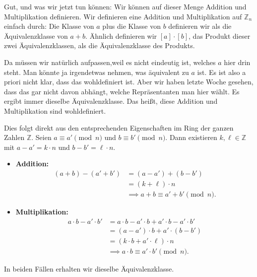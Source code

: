 \begin{spoken-clean}[00:08:20 - 00:10:21]
Gut, und was wir jetzt tun können: Wir können auf dieser Menge Addition und Multiplikation definieren. Wir definieren eine Addition und Multiplikation auf $\mathbb{Z}_n$ einfach durch: Die Klasse von $a$ plus die Klasse von $b$ definieren wir als die Äquivalenzklasse von $a + b$. Ähnlich definieren wir $[a] \cdot [b]$, das Produkt dieser zwei Äquivalenzklassen, als die Äquivalenzklasse des Produkts.

Da müssen wir natürlich aufpassen,weil es nicht eindeutig ist, welches $a$ hier drin steht. Man könnte ja irgendetwas nehmen, was äquivalent zu $a$ ist. Es ist also a priori nicht klar, dass das wohldefiniert ist. Aber wir haben letzte Woche gesehen, dass das gar nicht davon abhängt, welche Repräsentanten man hier wählt. Es ergibt immer dieselbe Äquivalenzklasse. Das heißt, diese Addition und Multiplikation sind wohldefiniert.
\end{spoken-clean}

\begin{math-stroke}

\begin{short-proof}
Dies folgt direkt aus den entsprechenden Eigenschaften im Ring der ganzen Zahlen $\mathbb{Z}$. Seien $a \equiv a' \pmod n$ und $b \equiv b' \pmod n$. Dann existieren $k, \ell \in \mathbb{Z}$ mit $a - a' = k \cdot n$ und $b - b' = \ell \cdot n$.

\begin{itemize}
    \item \textbf{Addition:} 
    \[
    \begin{aligned}
        (a + b) - (a' + b') &= (a - a') + (b - b') \\
        &= (k + \ell) \cdot n \\
        &\implies a + b \equiv a' + b' \pmod n.
    \end{aligned}
    \]
    \item \textbf{Multiplikation:} 
    \[
    \begin{aligned}
        a \cdot b - a' \cdot b' &= a \cdot b - a' \cdot b + a' \cdot b - a' \cdot b' \\
        &= (a - a') \cdot b + a' \cdot (b - b') \\
        &= (k \cdot b + a' \cdot \ell) \cdot n \\
        &\implies a \cdot b \equiv a' \cdot b' \pmod n.
    \end{aligned}
    \]
\end{itemize}

In beiden Fällen erhalten wir dieselbe Äquivalenzklasse.
\end{short-proof}
\end{math-stroke}

